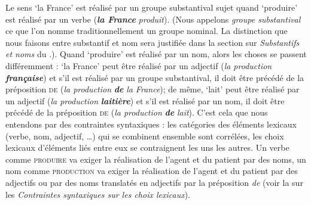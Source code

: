Le sens ‘la France’ est réalisé par un groupe substantival sujet quand ‘produire’ est réalisé par un verbe (\textbf{\textit{la France}} \textit{produit}). (Nous appelons \textit{groupe substantival} ce que l’on nomme traditionnellement un groupe nominal. La distinction que nous faisons entre substantif et nom sera justifiée dans la section sur \textit{Substantifs et noms} du .). Quand ‘produire’ est réalisé par un nom, alors les choses se passent différemment : ‘la France’ peut être réalisé par un adjectif (\textit{la production} \textbf{\textit{française}}) et s’il est réalisé par un groupe substantival, il doit être précédé de la préposition \textsc{de} (\textit{la production} \textbf{\textit{de}} \textit{la France}); de même, ‘lait’ peut être réalisé par un adjectif (\textit{la production} \textbf{\textit{laitière}}) et s’il est réalisé par un nom, il doit être précédé de la préposition \textsc{de} (\textit{la production} \textbf{\textit{de}} \textit{lait}). C’est cela que nous entendons par des contraintes syntaxiques : les catégories des éléments lexicaux (verbe, nom, adjectif, …) qui se combinent ensemble sont corrélées, les choix lexicaux d’éléments liés entre eux se contraignent les uns les autres. Un verbe comme \textsc{produire} va exiger la réalisation de l'agent et du patient par des noms, un nom  comme \textsc{production} va exiger la réalisation de l'agent et du patient par des adjectifs ou par des noms translatés en adjectifs par la préposition \textit{de} (voir la  sur les \textit{Contraintes syntaxiques sur les choix lexicaux}).\largerpage

